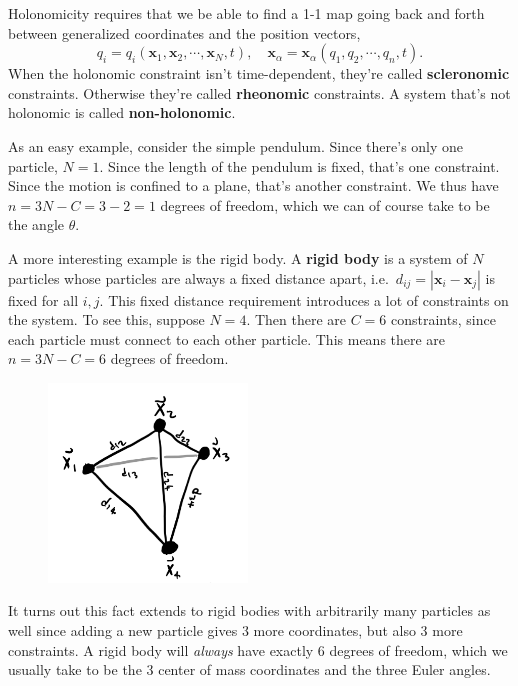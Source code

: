 \documentclass[
  letterpaper,
  DIV=11,
  numbers=noendperiod]{scrreprt}
\begin{document}
Holonomicity requires that we be able to find a 1-1 map going back and
forth between generalized coordinates and the position vectors, \[
q_i = q_i(\mathbf{x}_1, \mathbf{x}_2, \cdots, \mathbf{x}_N, t), \quad \mathbf{x}_\alpha = \mathbf{x}_\alpha(q_1, q_2, \cdots, q_n, t).
\] When the holonomic constraint isn't time-dependent, they're called
\textbf{scleronomic} constraints. Otherwise they're called
\textbf{rheonomic} constraints. A system that's not holonomic is called
\textbf{non-holonomic}.

As an easy example, consider the simple pendulum. Since there's only one
particle, \(N=1\). Since the length of the pendulum is fixed, that's one
constraint. Since the motion is confined to a plane, that's another
constraint. We thus have \(n=3N-C=3-2=1\) degrees of freedom, which we
can of course take to be the angle \(\theta\).

A more interesting example is the rigid body. A \textbf{rigid body} is a
system of \(N\) particles whose particles are always a fixed distance
apart, i.e.~\(d_{ij} = |\mathbf{x}_i - \mathbf{x}_j|\) is fixed for all
\(i, j\). This fixed distance requirement introduces a lot of
constraints on the system. To see this, suppose \(N=4\). Then there are
\(C=6\) constraints, since each particle must connect to each other
particle. This means there are \(n=3N-C=6\) degrees of freedom.

\begin{figure}

{\centering \includegraphics[width=2.08333in,height=\textheight]{classical-mechanics/./resources/image-20230218201852629.png}

}

\end{figure}

It turns out this fact extends to rigid bodies with arbitrarily many
particles as well since adding a new particle gives 3 more coordinates,
but also 3 more constraints. A rigid body will \emph{always} have
exactly 6 degrees of freedom, which we usually take to be the 3 center
of mass coordinates and the three Euler angles.
\end{document}
